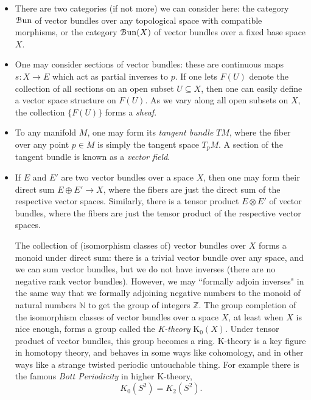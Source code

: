 \documentclass[10pt]{amsart}
\newcommand{\euscr}[1]{\EuScript{#1}}
\theoremstyle{definition}
\newcommand{\cdef}[1]{\textcolor{Bittersweet}{#1}}
\begin{document}
\begin{itemize}
    \item There are two categories (if not more) we can consider here: the category $\euscr{B}\mathrm{un}$ of vector bundles over any topological space with compatible morphisms, or the category $\euscr{B}\mathrm{un}(X)$ of vector bundles over a fixed base space $X$.
    \item One may consider sections of vector bundles: these are continuous maps $s:X \to E$ which act as partial inverses to $p$. If one lets $F(U)$ denote the collection of all sections on an open subset $U \subseteq X$, then one can easily define a vector space structure on $F(U)$. As we vary along all open subsets on $X$, the collection $\{F(U)\}$ forms a \cdef{\emph{sheaf}}.
    \item To any manifold $M$, one may form its \cdef{\emph{tangent bundle}} $TM$, where the fiber over any point $p \in M$ is simply the tangent space $T_pM$. A section of the tangent bundle is known as a \cdef{\emph{vector field}}.
    \item If $E$ and $E'$ are two vector bundles over a space $X$, then one may form their direct sum $E \oplus E' \to X$, where the fibers are just the direct sum of the respective vector spaces. Similarly, there is a tensor product $E \otimes E'$ of vector bundles, where the fibers are just the tensor product of the respective vector spaces.

    The collection of (isomorphism classes of) vector bundles over $X$ forms a monoid under direct sum: there is a trivial vector bundle over any space, and we can sum vector bundles, but we do not have inverses (there are no negative rank vector bundles). However, we may ``formally adjoin inverses" in the same way that we formally adjoining negative numbers to the monoid of natural numbers $\mathbb{N}$ to get the group of integers $\mathbb{Z}$. The group completion of the isomorphism classes of vector bundles over a space $X$, at least when $X$ is nice enough, forms a group called the \cdef{\emph{K-theory}} $\text{K}_0(X)$. Under tensor product of vector bundles, this group becomes a ring. K-theory is a key figure in homotopy theory, and behaves in some ways like cohomology, and in other ways like a strange twisted periodic untouchable thing. For example there is the famous \cdef{\emph{Bott Periodicity}} in higher K-theory,
    \[
    K_0(S^2) = K_2(S^2).
    \]
\end{itemize}
\end{document}
